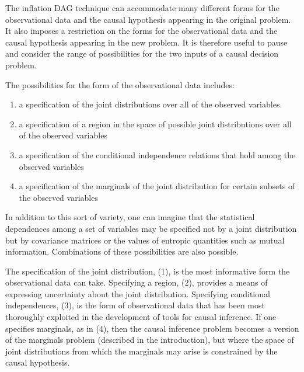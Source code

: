 
The inflation DAG technique can accommodate many different forms for the observational data and the causal hypothesis appearing in the original problem.  It also imposes a restriction on the forms for the observational data and the causal hypothesis appearing in the new problem.  It is therefore useful to pause and consider the range of possibilities for the two inputs of a causal decision problem. 

The possibilities for the form of the observational data includes:
\begin{enumerate}
\item a specification of the joint distributions over all of the observed variables.
\item a specification of a region in the space of possible joint distributions over all of the observed variables
\item a specification of the conditional independence relations that hold among the observed variables
\item a specification of the marginals of the joint distribution for certain subsets of the observed variables
\end{enumerate}
In addition to this sort of variety, one can imagine that the statistical dependences among a set of variables may be specified not by a joint distribution but by covariance matrices or the values of entropic quantities such as mutual information.  Combinations of these possibilities are also possible.

The specification of the joint distribution, (1), is the most informative form the observational data can take.  Specifying a region, (2), provides a means of expressing uncertainty about the joint distribution.  Specifying conditional independences, (3), is the form of observational data that has been most thoroughly exploited in the development of tools for causal inference.   If one specifies marginals, as in (4), then the causal inference problem becomes a version of the marginals problem (described in the introduction), but where the space of joint distributions from which the marginals may arise is constrained by the causal hypothesis.  

